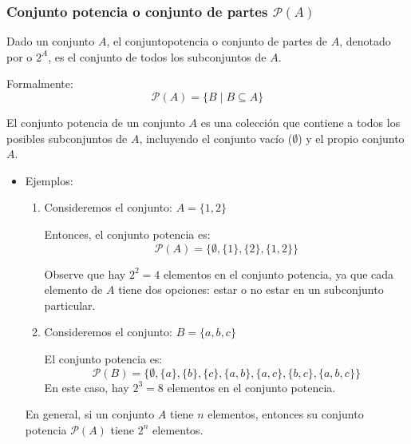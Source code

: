 \subsubsection{Conjunto potencia o conjunto de partes $\mathcal{P}(A)$}
\vspace{1em}
 
\begin{fmd-definition}
	Dado un conjunto \(A\), el \gls{conjuntopotencia} o conjunto de partes de \(A\), denotado por  o \(2^A\), es el conjunto de todos los subconjuntos de \(A\). 
	
	Formalmente:
	$$\mathcal{P}(A) = \{B \mid B \subseteq A\}$$
	
	El conjunto potencia de un conjunto \(A\) es una colección que contiene a todos los posibles subconjuntos de \(A\), incluyendo el conjunto vacío (\(\emptyset\)) y el propio conjunto \(A\).
\end{fmd-definition}

\begin{itemize}
	\item Ejemplos:
	
	\begin{enumerate}
		\item Consideremos el conjunto: \(A = \{1, 2\}\)
		
		Entonces, el conjunto potencia es:
		$$\mathcal{P}(A) = \{\emptyset, \{1\}, \{2\}, \{1, 2\}\}$$
		
		Observe que hay \(2^2 = 4\) elementos en el conjunto potencia, ya que cada elemento de \(A\) tiene dos opciones: estar o no estar en un subconjunto particular.
		
		\item Consideremos el conjunto: \(B = \{a, b, c\}\)
		
		El conjunto potencia es:
		$$\mathcal{P}(B) = \{\emptyset, \{a\}, \{b\}, \{c\}, \{a, b\}, \{a, c\}, \{b, c\}, \{a, b, c\}\}$$
		En este caso, hay \(2^3 = 8\) elementos en el conjunto potencia.
	\end{enumerate}
	
	En general, si un conjunto \(A\) tiene \(n\) elementos, entonces su conjunto potencia \(\mathcal{P}(A)\) tiene \(2^n\) elementos.
\end{itemize}

